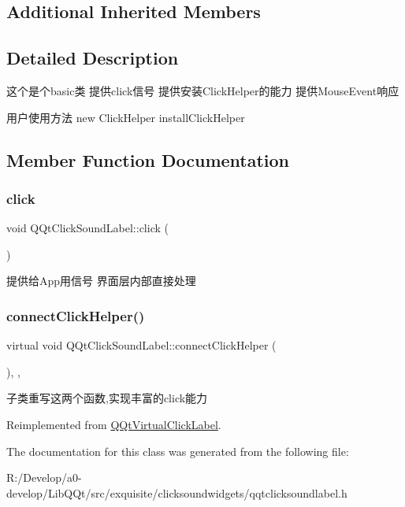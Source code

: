 \subsection*{Additional Inherited Members}


\subsection{Detailed Description}
这个是个basic类 提供click信号 提供安装\+Click\+Helper的能力 提供\+Mouse\+Event响应

用户使用方法 new Click\+Helper install\+Click\+Helper 

\subsection{Member Function Documentation}
\mbox{\label{class_q_qt_click_sound_label_a3e84481bb9531481ff9c1f6ec9d9246f}} 
\subsubsection{\texorpdfstring{click}{click}}
{\footnotesize\ttfamily void Q\+Qt\+Click\+Sound\+Label\+::click (\begin{DoxyParamCaption}{ }\end{DoxyParamCaption})\hspace{0.3cm}{\ttfamily [signal]}}

提供给\+App用信号 界面层内部直接处理 \mbox{\label{class_q_qt_click_sound_label_a2153c2a44777f2f3a4f22daee2872915}} 
\subsubsection{\texorpdfstring{connect\+Click\+Helper()}{connectClickHelper()}}
{\footnotesize\ttfamily virtual void Q\+Qt\+Click\+Sound\+Label\+::connect\+Click\+Helper (\begin{DoxyParamCaption}{ }\end{DoxyParamCaption})\hspace{0.3cm}{\ttfamily [inline]}, {\ttfamily [protected]}, {\ttfamily [virtual]}}

子类重写这两个函数,实现丰富的click能力 

Reimplemented from \mbox{\hyperlink{class_q_qt_virtual_click_label_a6e008887a4f2d5287e329a53caf8222c}{Q\+Qt\+Virtual\+Click\+Label}}.



The documentation for this class was generated from the following file\+:\begin{DoxyCompactItemize}
\item 
R\+:/\+Develop/a0-\/develop/\+Lib\+Q\+Qt/src/exquisite/clicksoundwidgets/qqtclicksoundlabel.\+h\end{DoxyCompactItemize}
